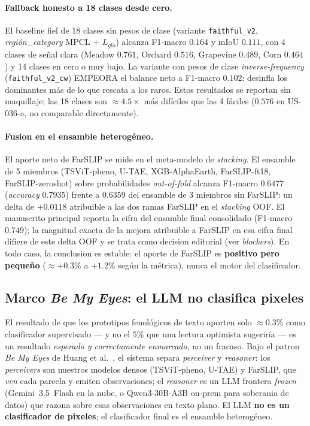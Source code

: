 

\paragraph{Fallback honesto a 18 clases desde cero.}
El baseline fiel de 18 clases sin pesos de clase (variante
\texttt{faithful\_v2}, \textit{región\_category} MPCL + $L_{glo}$) alcanza
F1-macro $0.164$ y mIoU $0.111$, con 4 clases de señal clara
(Meadow $0.761$, Orchard $0.516$, Grapevine $0.489$, Corn $0.464$) y 14 clases
en cero o muy bajo. La variante con pesos de clase \textit{inverse-frequency}
(\texttt{faithful\_v2\_cw}) EMPEORA el balance neto a F1-macro $0.102$: desinfla
los dominantes más de lo que rescata a los raros. Estos resultados se reportan
sin maquillaje; las 18 clases son $\approx4.5\times$ más difíciles que las 4
fáciles ($0.576$ en US-036-a, no comparable directamente).

\paragraph{Fusion en el ensamble heterogéneo.}
El aporte neto de FarSLIP se mide en el meta-modelo de \textit{stacking}. El
ensamble de 5 miembros (TSViT-pheno, U-TAE, XGB-AlphaEarth, FarSLIP-ft18,
FarSLIP-zeroshot) sobre probabilidades \textit{out-of-fold} alcanza F1-macro
$0.6477$ (\textit{accuracy} $0.7935$) frente a $0.6359$ del ensamble de 3
miembros sin FarSLIP: un delta de $+0.0118$ atribuible a las dos ramas FarSLIP en
el \textit{stacking} OOF. El manuscrito principal reporta la cifra del ensamble
final consolidado (F1-macro $0.749$); la magnitud exacta de la mejora atribuible
a FarSLIP en esa cifra final difiere de este delta OOF y se trata como decision
editorial (ver \textit{blockers}). En todo caso, la conclusion es estable: el
aporte de FarSLIP es \textbf{positivo pero pequeño} ($\approx+0.3\%$ a $+1.2\%$
según la métrica), nunca el motor del clasificador.

\subsection{Marco \textit{Be My Eyes}: el LLM no clasifica pixeles}
\label{sec:farslip_bemyeyes}

El resultado de que los prototipos fenológicos de texto aporten solo
$\approx0.3\%$ como clasificador supervisado --- y no el $5\%$ que una lectura
optimista sugeriría --- es un resultado \textit{esperado y correctamente
enmarcado}, no un fracaso. Bajo el patron \textit{Be My Eyes} de Huang et
al.~\cite{huang2025bemyeyes}, el sistema separa \textit{perceiver} y
\textit{reasoner}: los \textit{perceivers} son nuestros modelos densos
(TSViT-pheno, U-TAE) y FarSLIP, que \textit{ven} cada parcela y emiten
observaciones; el \textit{reasoner} es un LLM frontera \textit{frozen}
(Gemini~3.5~Flash en la nube, o Qwen3-30B-A3B on-prem para soberania de
datos) que razona sobre esas observaciones en texto plano. El LLM \textbf{no es
un clasificador de pixeles}; el clasificador final es el ensamble heterogéneo.

